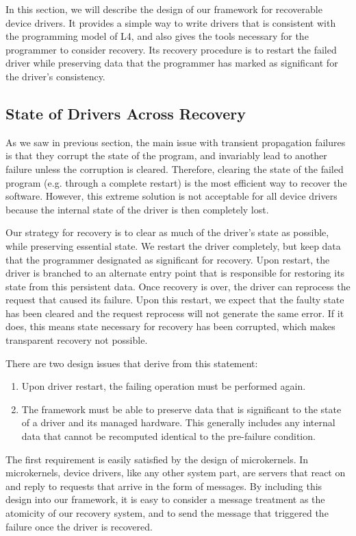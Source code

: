 \documentclass[times, 10pt, twocolumn]{article}
\begin{document}
In this section, we will describe the design of our framework for recoverable device drivers. It provides a simple way to write drivers that is consistent with the programming model of L4, and also gives the tools necessary for the programmer to consider recovery. Its recovery procedure is to restart the failed driver while preserving data that the programmer has marked as significant for the driver's consistency.

\subsection{State of Drivers Across Recovery}
\label{s:fw}

As we saw in previous section, the main issue with transient propagation failures is that they corrupt the state of the program, and invariably lead to another failure unless the corruption is cleared. Therefore, clearing the state of the failed program (e.g. through a complete restart) is the most efficient way to recover the software.  However, this extreme solution is not acceptable for all device drivers because the internal state of the driver is then completely lost.

Our strategy for recovery is to clear as much of the driver's state as possible, while preserving essential state. We restart the driver completely, but keep data that the programmer designated as significant for recovery.  Upon restart, the driver is branched to an alternate entry point that is responsible for restoring its state from this persistent data. Once  recovery is over, the driver can reprocess the request that caused its failure. Upon this restart, we expect that the faulty state has been cleared and the request reprocess will not generate the same error. If it does, this means state necessary for recovery has been corrupted, which makes transparent recovery not possible.

There are two design issues that derive from this statement:
\begin{enumerate}
\item Upon driver restart, the failing operation must be performed again.
\item The framework must be able to preserve data that is significant to the state of a driver and its managed hardware. This generally includes any internal data that cannot be recomputed identical to the pre-failure condition.
\end{enumerate}

The first requirement is easily satisfied by the design of microkernels.  In microkernels, device drivers, like any other system part, are servers that react on and reply to requests that arrive in the form of messages. By including this design into our framework, it is easy to consider a message treatment as the atomicity of our recovery system, and to send the message that triggered the failure once the driver is recovered.
\end{document}
